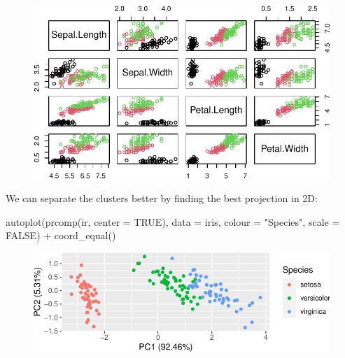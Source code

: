 \documentclass[
  letterpaper,
  DIV=11,
  numbers=noendperiod]{scrreprt}
\newenvironment{Shaded}{\begin{snugshade}}{\end{snugshade}}
\newcommand{\AttributeTok}[1]{\textcolor[rgb]{0.40,0.45,0.13}{#1}}
\newcommand{\ConstantTok}[1]{\textcolor[rgb]{0.56,0.35,0.01}{#1}}
\newcommand{\FunctionTok}[1]{\textcolor[rgb]{0.28,0.35,0.67}{#1}}
\newcommand{\NormalTok}[1]{\textcolor[rgb]{0.00,0.23,0.31}{#1}}
\newcommand{\SpecialCharTok}[1]{\textcolor[rgb]{0.37,0.37,0.37}{#1}}
\newcommand{\StringTok}[1]{\textcolor[rgb]{0.13,0.47,0.30}{#1}}
\begin{document}
\begin{figure}[H]

{\centering \includegraphics{./11-SVD_PCA_files/figure-pdf/unnamed-chunk-2-1.pdf}

}

\end{figure}

We can separate the clusters better by finding the best projection in
2D:

\begin{Shaded}
\begin{Highlighting}[]
\FunctionTok{autoplot}\NormalTok{(}\FunctionTok{prcomp}\NormalTok{(ir, }\AttributeTok{center =} \ConstantTok{TRUE}\NormalTok{), }
         \AttributeTok{data =}\NormalTok{ iris, }
         \AttributeTok{colour =} \StringTok{"Species"}\NormalTok{,}
         \AttributeTok{scale =} \ConstantTok{FALSE}\NormalTok{) }\SpecialCharTok{+} 
  \FunctionTok{coord\_equal}\NormalTok{()}
\end{Highlighting}
\end{Shaded}

\begin{figure}[H]

{\centering \includegraphics{./11-SVD_PCA_files/figure-pdf/unnamed-chunk-3-1.pdf}

}

\end{figure}
\end{document}
